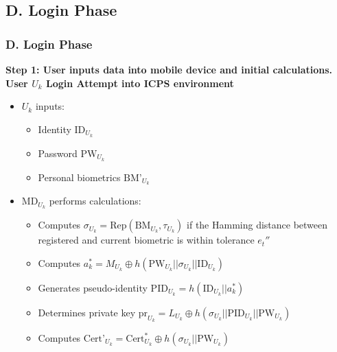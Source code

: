 \documentclass[9pt,handout]{beamer}
\begin{document}
\subsection{D. Login Phase}
\begin{frame}
    \frametitle{D. Login Phase}
    \textbf{Step 1: User inputs data into mobile device and initial calculations.\\}
    \textbf{User \( U_k \) Login Attempt into ICPS environment}
    
    \begin{itemize}
        \item \( U_k \) inputs:
        \begin{itemize}
            \item Identity \( \text{ID}_{U_k} \)
            \item Password \( \text{PW}_{U_k} \)
            \item Personal biometrics \( \text{BM'}_{U_k} \)
        \end{itemize}
        
        \item \( \text{MD}_{U_k} \) performs calculations:
        \begin{itemize}
            \item Computes \( \sigma_{U_k} = \text{Rep}(\text{BM}_{U_k}, \tau_{U_k}) \) if the Hamming distance between registered and current biometric is within tolerance \( e_t'' \)
            \item Computes \( a^*_k = M_{U_k} \oplus h(\text{PW}_{U_k} || \sigma_{U_k} || \text{ID}_{U_k}) \)
            \item Generates pseudo-identity \( \text{PID}_{U_k} = h(\text{ID}_{U_k} || a^*_k) \)
            \item Determines private key \( \text{pr}_{U_k} = L_{U_k} \oplus h(\sigma_{U_k} || \text{PID}_{U_k} || \text{PW}_{U_k}) \)
            \item Computes \( \text{Cert'}_{U_k} = \text{Cert}^*_{U_k} \oplus h(\sigma_{U_k} || \text{PW}_{U_k}) \)
        \end{itemize}
    \end{itemize}

\end{frame}
\end{document}
